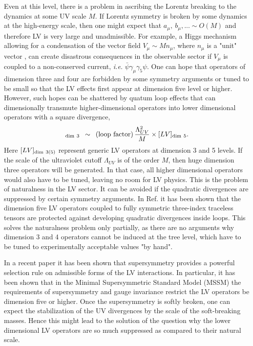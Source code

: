 \documentclass[12pt]{revtex4}
\begin{document}
Even at this level, there is a problem in ascribing the Lorentz breaking 
to the dynamics at some UV scale $M$. If Lorentz symmetry is broken by 
some dynamics at the high-energy scale, then one might expect that $a_\mu,~b_\mu,... \sim O(M)$
and therefore LV is very large and unadmissible. For example, a Higgs mechanism 
allowing for a condensation of the vector field $V_{\mu}\sim M n_\mu$, where $n_\mu$ is a 
"unit" vector \cite{Kostelecky:1989jw}, can create disastrous consequences in the observable sector if 
$V_\mu$ is coupled to a non-conserved current, {\em i.e.} $\bar \psi \gamma_\mu\gamma_5 \psi$.  
One can hope that operators of dimension three and four are forbidden by 
some symmetry arguments or tuned to be small so that the LV effects 
first appear at dimension five level \cite{MP:} 
or higher. However, such hopes can be shattered by quatum loop effects that 
can dimensionally transmute higher-dimensional operators into lower dimensional operators
with a square divergence,
\begin{equation}
[LV]_{\rm dim~3} \,~\sim~\, ({\rm loop~factor}) \, 
\frac{\Lambda_{UV}^2}{M} 
\times [LV]_{{\rm dim}~5}. 
\label{transmute}
\end{equation}
Here $[LV]_{\rm dim~3(5)}$ represent generic LV operators at dimension
3 and 5 levels. If the scale of the ultraviolet cutoff $\Lambda_{UV}$
is of the order $M$, then huge dimension three operators will be
generated. In that case, all higher dimensional operators would also 
have to be tuned, leaving no room for LV physics. This is the problem
of naturalness in the LV sector. It can be avoided if the quadratic
divergences are suppressed by certain symmetry arguments. In
Ref. \cite{MP:} it has been shown that the dimension five LV operators
coupled to fully symmetric three-index traceless tensors are protected
against developing quadratic divergences inside loops. This solves the
naturalness problem only partially, as there are no arguments why
dimension 3 and 4 operators cannot be induced at the tree level, which
have to be tuned to experimentally acceptable values  "by hand".  

In a recent paper \cite{GrootNibbelink:2004za} it has been shown that
supersymmetry provides a powerful selection  rule on admissible forms
of the LV interactions. In particular, it has been shown that  in the
Minimal Supersymmetric Standard Model (MSSM) the requirements of
supersymmetry and gauge invariance restrict the LV operators be
dimension five or higher. Once the supersymmetry is softly broken, one
can expect the stabilization of the UV divergences by the scale of the
soft-breaking masses. Hence this might lead to the solution of the question
why the lower dimensional LV operators are so much suppressed as
compared to their natural scale. 
\end{document}
